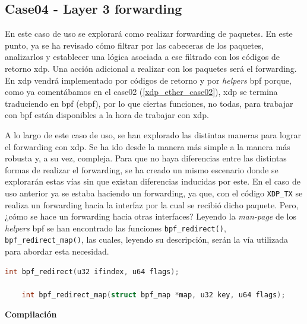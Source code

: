 \subsection{Case04 - Layer 3 forwarding}
\label{xdp_ether_case04}

En este caso de uso se explorará como realizar forwarding de paquetes. En este punto, ya se ha revisado cómo filtrar por las cabeceras de los paquetes, analizarlos y establecer una lógica asociada a ese filtrado con los códigos de retorno \gls{xdp}. Una acción adicional a realizar con los paquetes será el forwarding. En \gls{xdp} vendrá implementado por códigos de retorno y por \textit{helpers} \gls{bpf} porque, como ya comentábamos en el case02 (\ref{xdp_ether_case02}), \gls{xdp} se termina traduciendo en \gls{bpf} (e\gls{bpf}), por lo que ciertas funciones, no todas, para trabajar con \gls{bpf} están disponibles a la hora de trabajar con \gls{xdp}.\\
\par

A lo largo de este caso de uso, se han explorado las distintas maneras para lograr el forwarding con \gls{xdp}. Se ha ido desde la manera más simple a la manera más robusta y, a su vez, compleja. Para que no haya diferencias entre las distintas formas de realizar el forwarding, se ha creado un mismo escenario donde se explorarán estas vías sin que existan diferencias inducidas por este. En el caso de uso anterior ya se estaba haciendo un forwarding, ya que, con el código \texttt{XDP\_TX} se realiza un forwarding hacia la interfaz por la cual se recibió dicho paquete. Pero, ¿cómo se hace un forwarding hacia otras interfaces? Leyendo la \textit{man-page} de los \textit{helpers} \gls{bpf} se han encontrado las funciones \texttt{bpf\_redirect()}, \texttt{bpf\_redirect\_map()}, las cuales, leyendo su descripción, serán la vía utilizada para abordar esta necesidad.

\begin{lstlisting}[language=C, style=C-color, caption={Helper BPF para realizar Forwarding - Case04},label=code:case04_xdp_ether_kernprog1]
    int bpf_redirect(u32 ifindex, u64 flags);

    int bpf_redirect_map(struct bpf_map *map, u32 key, u64 flags);
\end{lstlisting}


\vspace{0.5cm}
\textbf{Compilación}\\
\par

